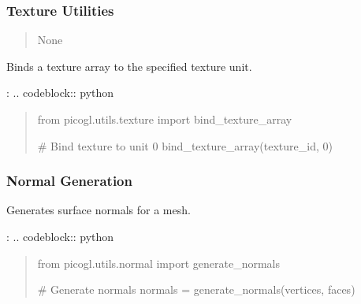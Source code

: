 \documentclass[a4paper,10pt,english,openany,oneside]{sphinxmanual}
\begin{document}
\subsubsection{Texture Utilities}
\label{\detokenize{api/utils:texture-utilities}}

\begin{fulllineitems}
\label{\detokenize{api/utils:picogl.utils.texture.bind_texture_array}}
\pysigstartsignatures
\pysiglinewithargsret
{}
{}
{}
\pysigstopsignatures\begin{quote}\begin{description}
\sphinxAtStartPar
{}

\sphinxAtStartPar
None

\end{description}\end{quote}

\end{fulllineitems}


\sphinxAtStartPar
Binds a texture array to the specified texture unit.

\sphinxAtStartPar
{}:
.. code\sphinxhyphen{}block:: python
\begin{quote}

\sphinxAtStartPar
from picogl.utils.texture import bind\_texture\_array

\sphinxAtStartPar
\# Bind texture to unit 0
bind\_texture\_array(texture\_id, 0)
\end{quote}


\subsubsection{Normal Generation}
\label{\detokenize{api/utils:normal-generation}}
\sphinxAtStartPar
Generates surface normals for a mesh.

\sphinxAtStartPar
{}:
.. code\sphinxhyphen{}block:: python
\begin{quote}

\sphinxAtStartPar
from picogl.utils.normal import generate\_normals

\sphinxAtStartPar
\# Generate normals
normals = generate\_normals(vertices, faces)
\end{quote}
\end{document}
